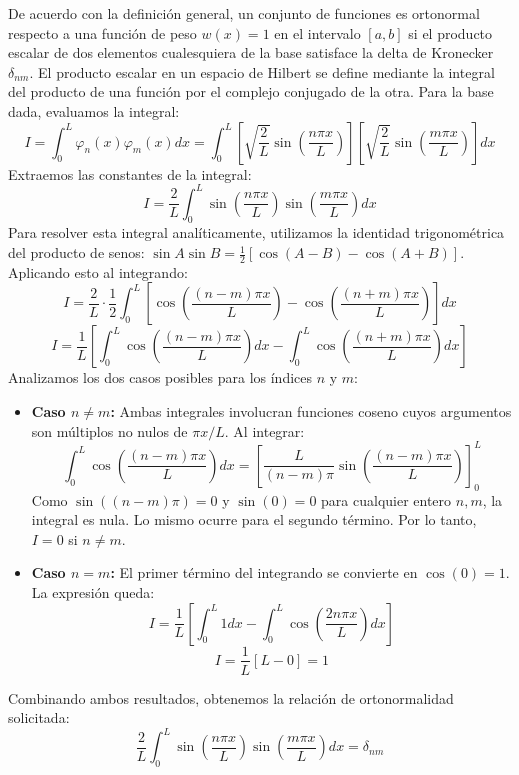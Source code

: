 \documentclass[a4paper]{article}
\begin{document}
De acuerdo con la definición general, un conjunto de funciones es ortonormal respecto a una función de peso $w(x) = 1$ en el intervalo $[a, b]$ si el producto escalar de dos elementos cualesquiera de la base satisface la delta de Kronecker $\delta_{nm}$. El producto escalar en un espacio de Hilbert se define mediante la integral del producto de una función por el complejo conjugado de la otra. Para la base dada, evaluamos la integral:
$$ I = \int_{0}^{L} \varphi_n(x) \varphi_m(x) dx = \int_{0}^{L} \left[ \sqrt{\frac{2}{L}} \sin\left(\frac{n\pi x}{L}\right) \right] \left[ \sqrt{\frac{2}{L}} \sin\left(\frac{m\pi x}{L}\right) \right] dx $$
Extraemos las constantes de la integral:
$$ I = \frac{2}{L} \int_{0}^{L} \sin\left(\frac{n\pi x}{L}\right) \sin\left(\frac{m\pi x}{L}\right) dx $$
Para resolver esta integral analíticamente, utilizamos la identidad trigonométrica del producto de senos: $\sin A \sin B = \frac{1}{2} [\cos(A-B) - \cos(A+B)]$. Aplicando esto al integrando:
$$ I = \frac{2}{L} \cdot \frac{1}{2} \int_{0}^{L} \left[ \cos\left(\frac{(n-m)\pi x}{L}\right) - \cos\left(\frac{(n+m)\pi x}{L}\right) \right] dx $$
$$ I = \frac{1}{L} \left[ \int_{0}^{L} \cos\left(\frac{(n-m)\pi x}{L}\right) dx - \int_{0}^{L} \cos\left(\frac{(n+m)\pi x}{L}\right) dx \right] $$
Analizamos los dos casos posibles para los índices $n$ y $m$:

\begin{itemize}
    \item \textbf{Caso $n \neq m$:}
    Ambas integrales involucran funciones coseno cuyos argumentos son múltiplos no nulos de $\pi x / L$. Al integrar:
    $$ \int_{0}^{L} \cos\left(\frac{(n-m)\pi x}{L}\right) dx = \left[ \frac{L}{(n-m)\pi} \sin\left(\frac{(n-m)\pi x}{L}\right) \right]_{0}^{L} $$
    Como $\sin((n-m)\pi) = 0$ y $\sin(0) = 0$ para cualquier entero $n, m$, la integral es nula. Lo mismo ocurre para el segundo término. Por lo tanto, $I = 0$ si $n \neq m$.

    \item \textbf{Caso $n = m$:}
    El primer término del integrando se convierte en $\cos(0) = 1$. La expresión queda:
    $$ I = \frac{1}{L} \left[ \int_{0}^{L} 1 dx - \int_{0}^{L} \cos\left(\frac{2n\pi x}{L}\right) dx \right] $$
    $$ I = \frac{1}{L} [ L - 0 ] = 1 $$
\end{itemize}

Combinando ambos resultados, obtenemos la relación de ortonormalidad solicitada:
$$ \frac{2}{L} \int_{0}^{L} \sin\left(\frac{n\pi x}{L}\right) \sin\left(\frac{m\pi x}{L}\right) dx = \delta_{nm} $$
\end{document}

